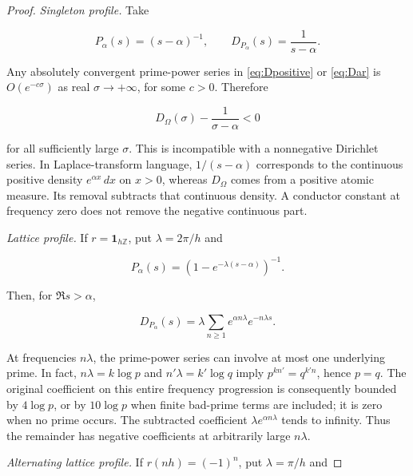 \begin{proof}\textit{Singleton profile.} Take

\begin{equation}\label{eq:ob3-2}
P_\alpha(s)=(s-\alpha)^{-1},\qquad
D_{P_\alpha}(s)=\frac1{s-\alpha}.
\end{equation}

Any absolutely convergent prime-power series in \eqref{eq:Dpositive} or \eqref{eq:Dar} is \(O(e^{-c\sigma})\) as real \(\sigma\to+\infty\), for some \(c>0\). Therefore

\begin{equation}\label{eq:ob3-3}
D_\Omega(\sigma)-\frac1{\sigma-\alpha}<0
\end{equation}

for all sufficiently large \(\sigma\). This is incompatible with a nonnegative Dirichlet series. In Laplace-transform language, \(1/(s-\alpha)\) corresponds to the continuous positive density \(e^{\alpha x}\,dx\) on \(x>0\), whereas \(D_\Omega\) comes from a positive atomic measure. Its removal subtracts that continuous density. A conductor constant at frequency zero does not remove the negative continuous part.

\textit{Lattice profile.} If \(r=\mathbf1_{h\mathbb Z}\), put \(\lambda=2\pi/h\) and

\begin{equation}\label{eq:ob3-4}
P_\alpha(s)=(1-e^{-\lambda(s-\alpha)})^{-1}.
\end{equation}

Then, for \(\Re s>\alpha\),

\begin{equation}\label{eq:ob3-5}
D_{P_\alpha}(s)=\lambda\sum_{n\ge1}
e^{\alpha n\lambda}e^{-n\lambda s}.
\end{equation}

At frequencies \(n\lambda\), the prime-power series can involve at most one underlying prime. In fact, \(n\lambda=k\log p\) and \(n'\lambda=k'\log q\) imply \(p^{kn'}=q^{k'n}\), hence \(p=q\). The original coefficient on this entire frequency progression is consequently bounded by \(4\log p\), or by \(10\log p\) when finite bad-prime terms are included; it is zero when no prime occurs. The subtracted coefficient \(\lambda e^{\alpha n\lambda}\) tends to infinity. Thus the remainder has negative coefficients at arbitrarily large \(n\lambda\).

\textit{Alternating lattice profile.} If \(r(nh)=(-1)^n\), put \(\lambda=\pi/h\) and


\end{proof}
